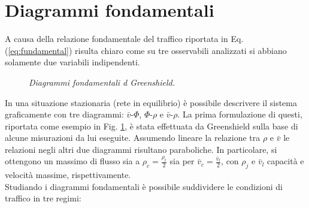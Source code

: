 \documentclass[../main.tex]{subfiles}
\begin{document}
\section{Diagrammi fondamentali}
A causa della relazione fondamentale del traffico riportata in Eq. (\ref{eq:fundamental}) risulta chiaro come su tre osservabili analizzati si abbiano solamente due variabili indipendenti.
\begin{figure}[H]
\centering
{}
\caption[Diagrammi fondamentali di Greenshield]{\emph{Diagrammi fondamentali d Greenshield.}}
\label{figure:greenshield}
\end{figure}
In una situazione stazionaria (rete in equilibrio) \`e possibile descrivere il sistema graficamente con tre diagrammi: $\bar{v}$-$\Phi$, $\Phi$-$\rho$ e $\bar{v}$-$\rho$.
La prima formulazione di questi, riportata come esempio in Fig. \ref{figure:greenshield}, \`e stata effettuata da Greenshield sulla base di alcune misurazioni da lui eseguite.
Assumendo lineare la relazione tra $\rho$ e $\bar{v}$ le relazioni negli altri due diagrammi risultano paraboliche.
In particolare, si ottengono un massimo di flusso sia a $\rho_c=\frac{\rho_t}{2}$ sia per $\bar{v}_c=\frac{\bar{v}_l}{2}$, con $\rho_j$ e $\bar{v}_l$ capacit\`a e velocit\`a massime, rispettivamente.
\\Studiando i diagrammi fondamentali \`e possibile suddividere le condizioni di traffico in tre regimi:
\end{document}
